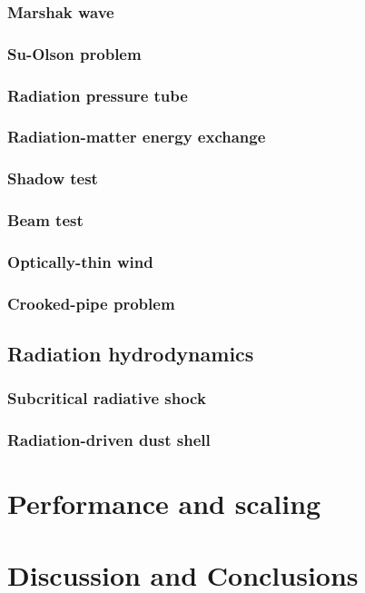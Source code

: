 \documentclass[fleqn,usenatbib]{mnras}
\begin{document}
\subsubsection{Marshak wave}
\subsubsection{Su-Olson problem}
\subsubsection{Radiation pressure tube}
\subsubsection{Radiation-matter energy exchange}
\subsubsection{Shadow test}
\subsubsection{Beam test}
\subsubsection{Optically-thin wind}
\subsubsection{Crooked-pipe problem}

\subsection{Radiation hydrodynamics}
\subsubsection{Subcritical radiative shock}
\subsubsection{Radiation-driven dust shell}

\section{Performance and scaling}
\label{section:performance}

\section{Discussion and Conclusions}
\label{section:discussion}
\end{document}
